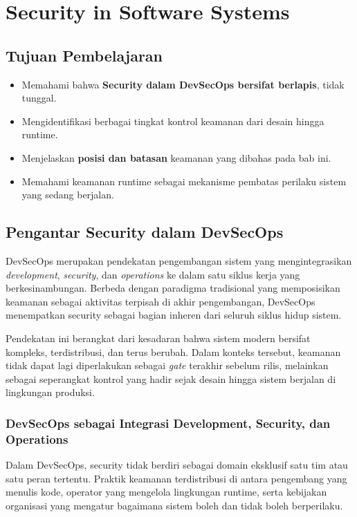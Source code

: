 \chapter{Security in Software Systems}

\section{Tujuan Pembelajaran}
\begin{itemize}
  \item Memahami bahwa \textbf{Security dalam DevSecOps bersifat berlapis}, tidak tunggal.
  \item Mengidentifikasi berbagai tingkat kontrol keamanan dari desain hingga runtime.
  \item Menjelaskan \textbf{posisi dan batasan} keamanan yang dibahas pada bab ini.
  \item Memahami keamanan runtime sebagai mekanisme pembatas perilaku sistem yang sedang berjalan.
\end{itemize}

\section{Pengantar Security dalam DevSecOps}

DevSecOps merupakan pendekatan pengembangan sistem yang mengintegrasikan \emph{development}, \emph{security}, dan \emph{operations} ke dalam satu siklus kerja yang berkesinambungan. Berbeda dengan paradigma tradisional yang memposisikan keamanan sebagai aktivitas terpisah di akhir pengembangan, DevSecOps menempatkan security sebagai bagian inheren dari seluruh siklus hidup sistem.

Pendekatan ini berangkat dari kesadaran bahwa sistem modern bersifat kompleks, terdistribusi, dan terus berubah. Dalam konteks tersebut, keamanan tidak dapat lagi diperlakukan sebagai \emph{gate} terakhir sebelum rilis, melainkan sebagai seperangkat kontrol yang hadir sejak desain hingga sistem berjalan di lingkungan produksi.

\subsection[DevSecOps sebagai Integrasi Development]{DevSecOps sebagai Integrasi Development, Security, dan Operations}

Dalam DevSecOps, security tidak berdiri sebagai domain eksklusif satu tim atau satu peran tertentu. Praktik keamanan terdistribusi di antara pengembang yang menulis kode, operator yang mengelola lingkungan runtime, serta kebijakan organisasi yang mengatur bagaimana sistem boleh dan tidak boleh berperilaku.

